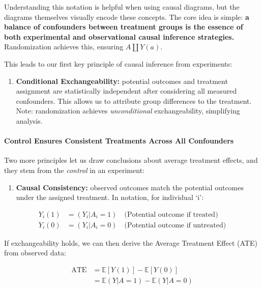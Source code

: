 \documentclass[
  singlecolumn]{article}
\let\oldparagraph\paragraph
\renewcommand{\paragraph}[1]{\oldparagraph{#1}\mbox{}}
\providecommand{\tightlist}{%
  \setlength{\itemsep}{0pt}\setlength{\parskip}{0pt}}\usepackage{longtable,booktabs,array}
\begin{document}
Understanding this notation is helpful when using causal diagrams, but
the diagrams themselves visually encode these concepts. The core idea is
simple: \textbf{a balance of confounders between treatment groups is the
essence of both experimental and observational causal inference
strategies.} Randomization achieves this, ensuring \(A \coprod Y(a)\).

This leads to our first key principle of causal inference from
experiments:

\begin{enumerate}
\def\labelenumi{\arabic{enumi}.}
\tightlist
\item
  \textbf{Conditional Exchangeability:} potential outcomes and treatment
  assignment are statistically independent after considering all
  measured confounders. This allows us to attribute group differences to
  the treatment. Note: randomization achieves \emph{unconditional}
  exchangeability, simplifying analysis.
\end{enumerate}

\paragraph{Control Ensures Consistent Treatments Across All
Confounders}\label{control-ensures-consistent-treatments-across-all-confounders}

Two more principles let us draw conclusions about average treatment
effects, and they stem from the \emph{control} in an experiment:

\begin{enumerate}
\def\labelenumi{\arabic{enumi}.}
\setcounter{enumi}{1}
\tightlist
\item
  \textbf{Causal Consistency:} observed outcomes match the potential
  outcomes under the assigned treatment. In notation, for individual
  `i':
\end{enumerate}

\[
\begin{aligned}
Y_{i}(1) &= (Y_{i}|A_{i} = 1) \quad \text{(Potential outcome if treated)} \\
Y_{i}(0) &= (Y_{i}|A_{i} = 0) \quad \text{(Potential outcome if untreated)}
\end{aligned}
\]

If exchangeability holds, we can then derive the Average Treatment
Effect (ATE) from observed data:

\[
\begin{aligned}
\text{ATE} &= \mathbb{E}[Y(1)] - \mathbb{E}[Y(0)] \\
&= \mathbb{E}(Y|A=1) - \mathbb{E}(Y|A=0)
\end{aligned}
\]
\end{document}
